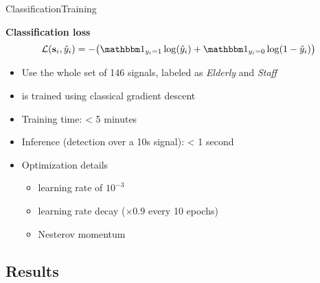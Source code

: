\begin{frame}{Classification}{Training}
\vspace{0.2cm}
\centering
\begin{minipage}[t]{0.8\linewidth}

\centering\textbf{Classification loss}
\begin{equation*}\label{eq: loss training algp}
    \mathcal{L}(\bfs_i, \hat{y}_i) = - \big( \bbmind_{{y_i =1}} \log( \hat{y}_i ) + \bbmind_{ y_i=0 } \log(1- \hat{y}_i) \big)
\end{equation*}

    \begin{itemize}
        \item Use the whole set of 146 signals, labeled as \emph{Elderly} and \emph{Staff} 
        \item \subalgo is trained using classical gradient descent
        \item Training time: < 5 minutes
        \item Inference (detection over a 10s signal): < 1 second
        \item Optimization details
        \begin{itemize}
            \item learning rate of $10^{-3}$
            \item learning rate decay ($\times 0.9$ every 10 epochs)
            \item Nesterov momentum
        \end{itemize}
    \end{itemize}

\end{minipage}

\end{frame}

\subsection{Results}


